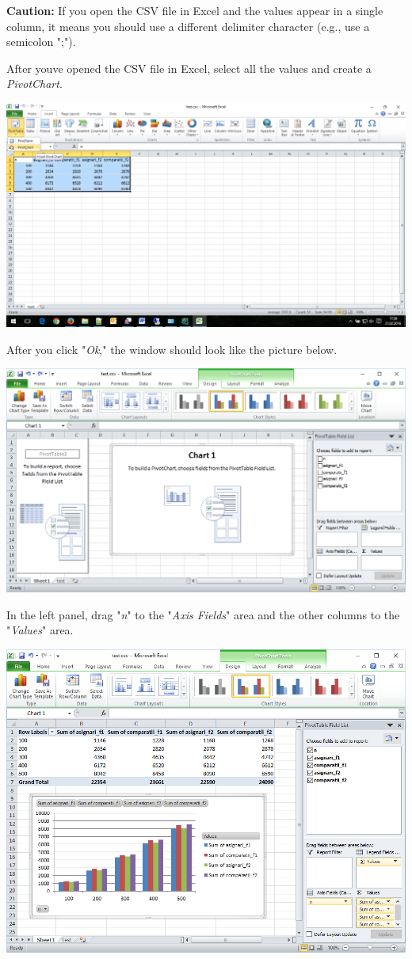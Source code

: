 \documentclass[../en-fa-lab.tex]{subfiles}
\begin{document}
\textbf{Caution:} If you open the CSV file in Excel and the values
appear in a single column, it means you should use a different delimiter
character (e.g., use a semicolon ";").

After you\textquotesingle ve opened the CSV file in Excel, select all
the values and create a \emph{PivotChart}.

\includegraphics[width=\textwidth]{../Resources/lab0/image11.png}

After you click "\emph{Ok}," the window should look like the picture
below.

\includegraphics[width=\textwidth]{../Resources/lab0/image12.png}

In the left panel, drag "\emph{n}" to the "\emph{Axis Fields}" area and
the other columns to the "\emph{Values}" area.

\includegraphics[width=\textwidth]{../Resources/lab0/image13.png}
\end{document}
